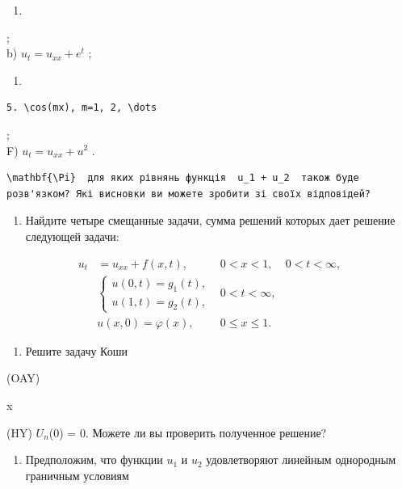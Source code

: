 \documentclass[
  ukrainian,
]{article}
\providecommand{\tightlist}{%
  \setlength{\itemsep}{0pt}\setlength{\parskip}{0pt}}
\begin{document}
\begin{enumerate}
\def\labelenumi{\alph{enumi})}
\tightlist
\item
\end{enumerate}

;\\
b) \(u_t = u_{xx} + e^t\) ;

\begin{enumerate}
\def\labelenumi{\Alph{enumi})}
\setcounter{enumi}{1}
\tightlist
\item
\end{enumerate}

\begin{verbatim}
5. \cos(mx), m=1, 2, \dots
\end{verbatim}

;\\
F) \(u_t = u_{xx} + u^2\) .

\begin{verbatim}
\mathbf{\Pi}  для яких рівнянь функція  u_1 + u_2  також буде розв'язком? Які висновки ви можете зробити зі своїх відповідей?
\end{verbatim}

\begin{enumerate}
\def\labelenumi{\arabic{enumi}.}
\setcounter{enumi}{3}
\tightlist
\item
  Найдите четыре смещанные задачи, сумма решений которых дает решение
  следующей задачи:
\end{enumerate}

\[
\begin{aligned} u_t &= u_{xx} + f(x, t), & 0 < x < 1, & 0 < t < \infty, \\ & \begin{cases} u(0, t) = g_1(t), \\ u(1, t) = g_2(t), \end{cases} & 0 < t < \infty, \\ & u(x, 0) = \varphi(x), & 0 \le x \le 1. \end{aligned}
\]

\begin{enumerate}
\def\labelenumi{\arabic{enumi}.}
\setcounter{enumi}{4}
\tightlist
\item
  Решите задачу Коши
\end{enumerate}

(OAY)

x

(HY) \(U_n\)(0) = 0. Можете ли вы проверить полученное решение?

\begin{enumerate}
\def\labelenumi{\arabic{enumi}.}
\setcounter{enumi}{5}
\tightlist
\item
  Предположим, что функции \(u_1\) и \(u_2\) удовлетворяют линейным
  однородным граничным условиям
\end{enumerate}
\end{document}
